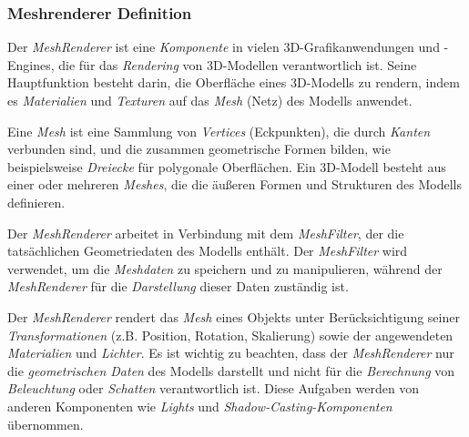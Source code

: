 \subsubsection*{Meshrenderer Definition} %
Der \textit{MeshRenderer} ist eine \textit{Komponente} in vielen 3D-Grafikanwendungen und -Engines, die für das \textit{Rendering}
von 3D-Modellen verantwortlich ist. Seine Hauptfunktion besteht darin, die Oberfläche eines 3D-Modells zu rendern, indem
es \textit{Materialien} und \textit{Texturen} auf das \textit{Mesh} (Netz) des Modells anwendet.

Eine \textit{Mesh} ist eine Sammlung von \textit{Vertices} (Eckpunkten), die durch \textit{Kanten} verbunden sind, und die
zusammen geometrische Formen bilden, wie beispielsweise \textit{Dreiecke} für polygonale Oberflächen. Ein 3D-Modell besteht
aus einer oder mehreren \textit{Meshes}, die die äußeren Formen und Strukturen des Modells definieren.

Der \textit{MeshRenderer} arbeitet in Verbindung mit dem \textit{MeshFilter}, der die tatsächlichen Geometriedaten des
Modells enthält. Der \textit{MeshFilter} wird verwendet, um die \textit{Meshdaten} zu speichern und zu manipulieren,
während der \textit{MeshRenderer} für die \textit{Darstellung} dieser Daten zuständig ist.

Der \textit{MeshRenderer} rendert das \textit{Mesh} eines Objekts unter Berücksichtigung seiner \textit{Transformationen}
(z.B. Position, Rotation, Skalierung) sowie der angewendeten \textit{Materialien} und \textit{Lichter}. Es ist wichtig zu
beachten, dass der \textit{MeshRenderer} nur die \textit{geometrischen Daten} des Modells darstellt und nicht für die
\textit{Berechnung} von \textit{Beleuchtung} oder \textit{Schatten} verantwortlich ist. Diese Aufgaben werden von anderen
Komponenten wie \textit{Lights} und \textit{Shadow-Casting-Komponenten} übernommen.

